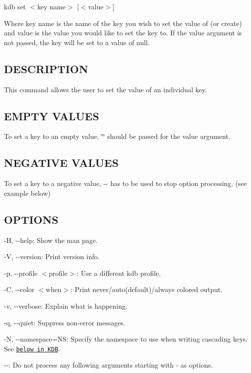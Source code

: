 {\ttfamily kdb set $<$key name$>$ \mbox{[}$<$value$>$\mbox{]}}

Where {\ttfamily key name} is the name of the key you wish to set the value of (or create) and {\ttfamily value} is the value you would like to set the key to. If the {\ttfamily value} argument is not passed, the key will be set to a value of {\ttfamily null}.

\subsection*{D\+E\+S\+C\+R\+I\+P\+T\+I\+ON}

This command allows the user to set the value of an individual key.

\subsection*{E\+M\+P\+TY V\+A\+L\+U\+ES}

To set a key to an empty value, {\ttfamily \char`\"{}\char`\"{}} should be passed for the {\ttfamily value} argument.

\subsection*{N\+E\+G\+A\+T\+I\+VE V\+A\+L\+U\+ES}

To set a key to a negative value, {\ttfamily -\/-\/} has to be used to stop option processing. (see example below)

\subsection*{O\+P\+T\+I\+O\+NS}


\begin{DoxyItemize}
\item {\ttfamily -\/H}, {\ttfamily -\/-\/help}\+: Show the man page.
\item {\ttfamily -\/V}, {\ttfamily -\/-\/version}\+: Print version info.
\item {\ttfamily -\/p}, {\ttfamily -\/-\/profile $<$profile$>$}\+: Use a different kdb profile.
\item {\ttfamily -\/C}, {\ttfamily -\/-\/color $<$when$>$}\+: Print never/auto(default)/always colored output.
\item {\ttfamily -\/v}, {\ttfamily -\/-\/verbose}\+: Explain what is happening.
\item {\ttfamily -\/q}, {\ttfamily -\/-\/quiet}\+: Suppress non-\/error messages.
\item {\ttfamily -\/N}, {\ttfamily -\/-\/namespace=NS}\+: Specify the namespace to use when writing cascading keys. See \href{#KDB}{\tt below in K\+DB}.
\item {\ttfamily -\/-\/}\+: Do not process any following arguments starting with {\ttfamily -\/} as options.
\end{DoxyItemize}

